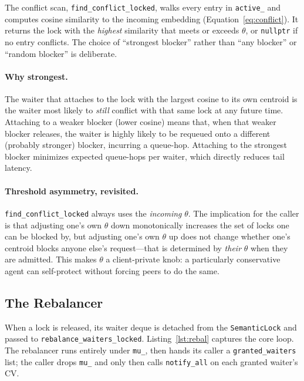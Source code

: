\documentclass[sigconf]{acmart}
\begin{document}
The conflict scan, \texttt{find\_conflict\_locked}, walks every entry
in \texttt{active\_} and computes cosine similarity to the incoming
embedding (Equation~\ref{eq:conflict}). It returns the lock with the
\emph{highest} similarity that meets or exceeds $\theta$, or
\texttt{nullptr} if no entry conflicts. The choice of ``strongest
blocker'' rather than ``any blocker'' or ``random blocker'' is
deliberate.

\paragraph{\textbf{Why strongest.}} The waiter that attaches to the lock with
the largest cosine to its own centroid is the waiter most likely to
\emph{still} conflict with that same lock at any future time. Attaching
to a weaker blocker (lower cosine) means that, when that weaker blocker
releases, the waiter is highly likely to be requeued onto a different
(probably stronger) blocker, incurring a queue-hop. Attaching to the
strongest blocker minimizes expected queue-hops per waiter, which directly
reduces tail latency.

\paragraph{\textbf{Threshold asymmetry, revisited.}}
\texttt{find\_conflict\_locked} always uses the \emph{incoming}
$\theta$. The implication for the caller is that adjusting one's own
$\theta$ down monotonically increases the set of locks one can be
blocked by, but adjusting one's own $\theta$ up does not change whether
one's centroid blocks anyone else's request---that is determined by
\emph{their} $\theta$ when they are admitted. This makes $\theta$ a
client-private knob: a particularly conservative agent can self-protect
without forcing peers to do the same.

\subsection{The Rebalancer}
\label{sec:rebalancer}

When a lock is released, its waiter deque is detached from the
\texttt{SemanticLock} and passed to
\texttt{rebalance\_waiters\_locked}. Listing~\ref{lst:rebal} captures
the core loop. The rebalancer runs entirely under \texttt{mu\_}, then
hands its caller a \texttt{granted\_waiters} list; the caller drops
\texttt{mu\_} and only then calls \texttt{notify\_all} on each granted
waiter's CV.
\end{document}
